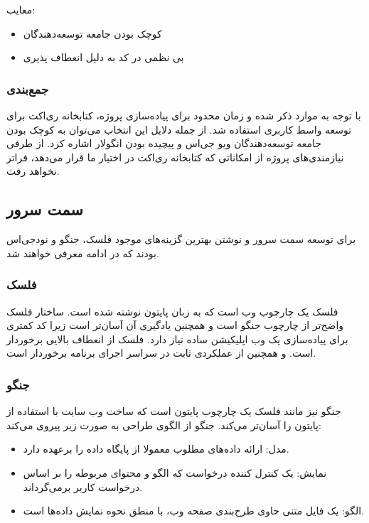 معایب:

\begin{itemize}
    \item کوچک بودن جامعه توسعه‌دهندگان
    \item بی نظمی در کد به دلیل انعطاف پذیری 
\end{itemize}


\subsubsection{جمع‌بندی}

با توجه به موارد ذکر شده و زمان محدود برای پیاده‌سازی پروژه، کتابخانه ری‌اکت برای توسعه واسط کاربری استفاده شد. از جمله دلایل این انتخاب می‌توان به کوچک بودن جامعه توسعه‌دهندگان ویو جی‌اس و پیچیده بودن انگولار اشاره کرد. از طرفی نیازمندی‌های پروژه از امکاناتی که کتابخانه ری‌اکت در اختیار ما قرار می‌دهد، فراتر نخواهد رفت.


\subsection{سمت سرور}
برای توسعه سمت سرور و نوشتن  بهترین گزینه‌های موجود فلسک، جنگو و نودجی‌اس بودند که در ادامه معرفی خواهند شد.

\subsubsection{فلسک}
فلسک یک چارچوب وب است که به زبان پایتون نوشته شده است. ساختار فلسک واضح‌تر از چارچوب جنگو است و همچنین یادگیری آن آسان‌تر است زیرا کد کمتری برای پیاده‌سازی یک وب اپلیکیشن ساده نیاز دارد. فلسک از انعطاف بالایی برخوردار است. و همچنین از عملکردی ثابت در سراسر اجرای برنامه برخوردار است.

\subsubsection{جنگو }

جنگو نیز مانند فلسک یک چارچوب پایتون است که ساخت وب سایت با استفاده از پایتون را آسان‌تر می‌کند. جنگو از الگوی طراحی  به صورت زیر پیروی می‌کند:

\begin{itemize}
    \item مدل: ارائه داده‌های مطلوب معمولا از پایگاه داده را برعهده دارد.
    \item نمایش: یک کنترل کننده درخواست که الگو و محتوای مربوطه را بر اساس درخواست کاربر برمی‌گرداند.
    \item الگو: یک فایل متنی حاوی طرح‌بندی صفحه وب، با منطق نحوه نمایش داده‌ها است.
\end{itemize}


